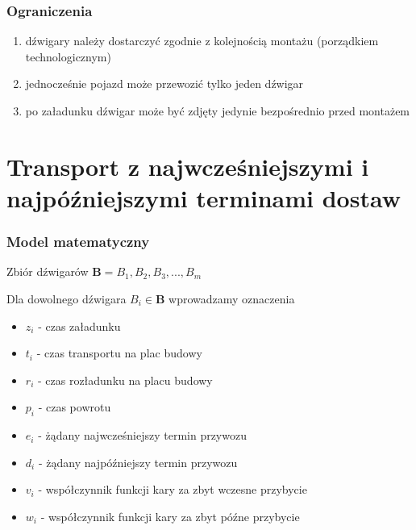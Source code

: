 \documentclass{beamer}
\begin{document}
  \begin{frame}
  \frametitle{{Ograniczenia}}
   \begin{enumerate}
    \item dźwigary należy dostarczyć zgodnie z kolejnością montażu (porządkiem technologicznym)
    \item jednocześnie pojazd może przewozić tylko jeden dźwigar
    \item po załadunku dźwigar może być zdjęty jedynie bezpośrednio przed montażem
   \end{enumerate}
   \end{frame}
  


\section{Transport z najwcześniejszymi i najpóźniejszymi terminami dostaw}
 \begin{frame}
 \frametitle{Model matematyczny}
 \begin{block}{Zbiór dźwigarów}
  $ \textbf{B} = { B_1, B_2, B_3,...,B_m} $
 \end{block}
 
 \begin{block} {Dla dowolnego dźwigara $ B_i \in \textbf{B} $ wprowadzamy oznaczenia}
 \begin{itemize}
  \item $ z_i $ - czas załadunku
  \item $ t_i $ - czas transportu na plac budowy 
  \item $ r_i $ - czas rozładunku na placu budowy 
  \item $ p_i $ - czas powrotu
  \item $ e_i $ - żądany najwcześniejszy termin przywozu 
  \item $ d_i $ - żądany najpóźniejszy termin przywozu
  \item $ v_i $ - współczynnik funkcji kary za zbyt wczesne przybycie 
  \item $ w_i $ - współczynnik funkcji kary za zbyt późne przybycie
 \end{itemize}
 \end{block}
\end{frame}
\end{document}
